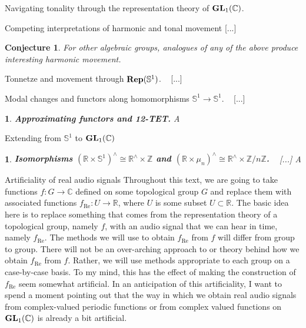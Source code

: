 \documentclass[letterpaper,11pt, reqno]{amsart}
\newtheorem{monodromy theorem}{Monodromy Theorem}[subsection]
\newtheorem{wild conjecture}[theorem]{Wild Conjecture}
\newtheorem{research objectives}{Research objectives}[subsection]
\newtheorem{research question}[theorem]{Research questions}
\newtheorem{aside question}[theorem]{Aside question}
\newtheorem{conjecture}[theorem]{Conjecture}
\newtheorem{audio example}[theorem]{\loudspeaker[3] Example}
\newtheorem{blank remark}[theorem]{}
\newtheorem{ssubsection}[theorem]{}
\newtheorem{terminology and comment}[theorem]{Terminology and comment}
\newtheorem{purity hypothesis}[theorem]{Purity hypothesis}
\newtheorem{corollary of the purity hypothesis}[theorem]{Corollary of the purity hypothesis}
\newcommand{\CC} {{\mathbb C}}
\newcommand{\RR} {{\mathbb R}}
\newcommand{\ZZ} {{\mathbb Z}}
\newcommand{\lra}{{\longrightarrow}}
\numberwithin{equation}{theorem}
\begin{document}
\begin{section}{Navigating tonality through the representation theory of $\bold{GL}_{1}(\CC)$.}
\begin{subsection}{Competing interpretations of harmonic and tonal movement}
{\color{red} [...]}

\begin{conjecture}
\normalfont
For other algebraic groups, analogues of {\em any} of the above produce interesting harmonic movement.
\end{conjecture}

\end{subsection}

\begin{subsection}{Tonnetze and movement through $\bold{Rep}(\mathbb{S}^{1})$.}
\ {\color{red} [...]}
\end{subsection}

\begin{subsection}{Modal changes and functors along homomorphisms $\mathbb{S}^{1}\longrightarrow\mathbb{S}^{1}$.}
\ {\color{red} [...]}

\begin{ssubsection}
\normalfont
{\bf Approximating functors and 12-TET.}
A
\end{ssubsection}

\end{subsection}

\begin{subsection}{Extending from $\mathbb{S}^{1}$ to $\bold{GL}_{1}(\CC)$}



\begin{ssubsection}
\normalfont
{\bf Isomorphisms $(\RR\!\times\!\mathbb{S}^{1})^\wedge\cong\RR^\wedge\!\times\!\ZZ$ and $(\RR\!\times\!{\mu}_{n})^\wedge\cong\RR^\wedge\!\times\!\ZZ/n\ZZ$.}
\ {\color{red} [...]}
A
\end{ssubsection}

\end{subsection}

\begin{subsection}{Artificiality of real audio signals}
	Throughout this text, we are going to take functions $f:G\lra\CC$ defined on some topological group $G$ and replace them with associated functions $f_{\text{Re}}:U\lra\RR$, where $U$ is some subset $U\subset\RR$. The basic idea here is to replace something that comes from the representation theory of a topological group, namely $f$, with an audio signal that we can hear in time, namely $f_{\text{Re}}$. The methods we will use to obtain $f_{\text{Re}}$ from $f$ will differ from group to group. There will not be an over-arching approach to or theory behind how we obtain $f_{\text{Re}}$ from $f$. Rather, we will use methods appropriate to each group on a case-by-case basis. To my mind, this has the effect of making the construction of $f_{\text{Re}}$ seem somewhat artificial. In an anticipation of this artificiality, I want to spend a moment pointing out that the way in which we obtain real audio signals from complex-valued periodic functions or from complex valued functions on $\bold{GL}_{1}(\CC)$ is already a bit artificial.
	

\end{subsection}
\end{section}
\end{document}
